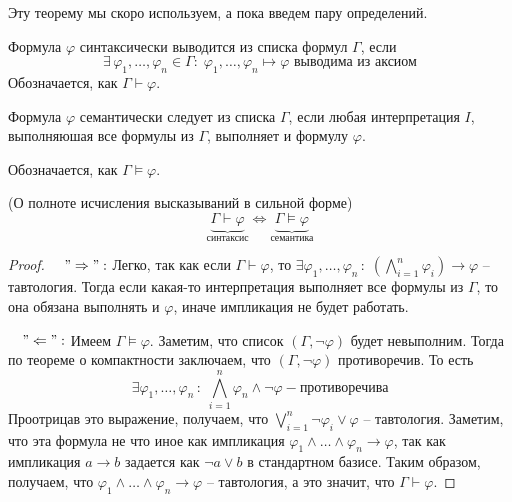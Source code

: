 \vspace{3mm}

Эту теорему мы скоро используем, а пока введем пару определений.

\begin{conj}
    Формула $\varphi$ синтаксически выводится из списка формул $\Gamma$, если \[ \exists \, \varphi_1, \dots, \varphi_n \in \Gamma : \; \varphi_1, \dots, \varphi_n \mapsto \varphi \text{ выводима из аксиом} \]
    Обозначается, как $\Gamma \vdash \varphi$.
\end{conj}

\vspace{5mm}

\begin{conj}
    Формула $\varphi$ семантически следует из списка $\Gamma$, если любая интерпретация $I$, выполняюшая все формулы из $\Gamma$, выполняет и формулу $\varphi$.

    Обозначается, как $\Gamma \models \varphi$.
\end{conj}

\vspace{5mm}

\begin{theorem}
    (О полноте исчисления высказываний в сильной форме) \[ \underbrace{\Gamma \vdash \varphi}_{\text{синтаксис}} \Longleftrightarrow \underbrace{\Gamma \models \varphi}_{\text{семантика}} \]
\end{theorem}
\begin{proof}
    \quad

    $\quad "\Rightarrow":$ Легко, так как если $\Gamma \vdash \varphi$, то $\exists \varphi_1, \dots, \varphi_n \, : \; (\bigwedge\limits_{i = 1}^n \varphi_i) \to \varphi$  -- тавтология. Тогда если какая-то интерпретация выполняет все формулы из $\Gamma$, то она обязана выполнять и $\varphi$, иначе импликация не будет работать.

    $\quad "\Leftarrow":$ Имеем $\Gamma \models \varphi$. Заметим, что список $(\Gamma, \neg \varphi)$ будет невыполним. Тогда по теореме о компактности заключаем, что $(\Gamma, \neg \varphi)$ противоречив. То есть \[ \exists \varphi_1, \dots, \varphi_n \, : \; \bigwedge_{i = 1}^n \varphi_n \land \neg \varphi - \text{противоречива} \]
    \quad\quad Проотрицав это выражение, получаем, что $\bigvee\limits_{i = 1}^n \neg \varphi_i \lor \varphi$ -- тавтология. Заметим, что эта формула не что иное как импликация $\varphi_1 \land \dots \land \varphi_n \to \varphi$, так как импликация $a \to b$ задается как $\neg a \lor b$ в стандартном базисе. Таким образом, получаем, что  $\varphi_1 \land \dots \land \varphi_n \to \varphi$ -- тавтология, а это значит, что $\Gamma \vdash \varphi$.
\end{proof}

